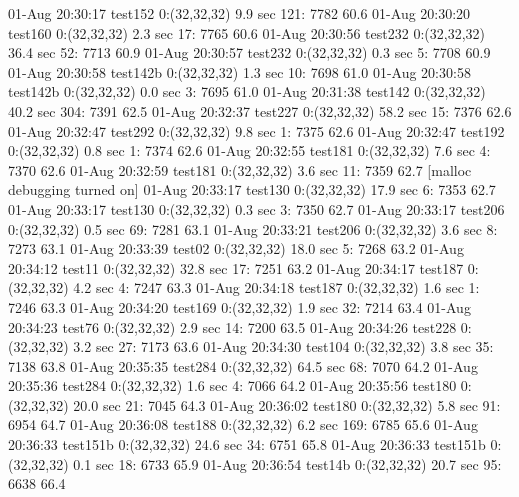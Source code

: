 01-Aug 20:30:17 test152     0:(32,32,32)     9.9 sec  121:  7782 60.6%
01-Aug 20:30:20 test160     0:(32,32,32)     2.3 sec   17:  7765 60.6%
01-Aug 20:30:56 test232     0:(32,32,32)    36.4 sec   52:  7713 60.9%
01-Aug 20:30:57 test232     0:(32,32,32)     0.3 sec    5:  7708 60.9%
01-Aug 20:30:58 test142b    0:(32,32,32)     1.3 sec   10:  7698 61.0%
01-Aug 20:30:58 test142b    0:(32,32,32)     0.0 sec    3:  7695 61.0%
01-Aug 20:31:38 test142     0:(32,32,32)    40.2 sec  304:  7391 62.5%
01-Aug 20:32:37 test227     0:(32,32,32)    58.2 sec   15:  7376 62.6%
01-Aug 20:32:47 test292     0:(32,32,32)     9.8 sec    1:  7375 62.6%
01-Aug 20:32:47 test192     0:(32,32,32)     0.8 sec    1:  7374 62.6%
01-Aug 20:32:55 test181     0:(32,32,32)     7.6 sec    4:  7370 62.6%
01-Aug 20:32:59 test181     0:(32,32,32)     3.6 sec   11:  7359 62.7%
[malloc debugging turned on]
01-Aug 20:33:17 test130     0:(32,32,32)    17.9 sec    6:  7353 62.7%
01-Aug 20:33:17 test130     0:(32,32,32)     0.3 sec    3:  7350 62.7%
01-Aug 20:33:17 test206     0:(32,32,32)     0.5 sec   69:  7281 63.1%
01-Aug 20:33:21 test206     0:(32,32,32)     3.6 sec    8:  7273 63.1%
01-Aug 20:33:39 test02      0:(32,32,32)    18.0 sec    5:  7268 63.2%
01-Aug 20:34:12 test11      0:(32,32,32)    32.8 sec   17:  7251 63.2%
01-Aug 20:34:17 test187     0:(32,32,32)     4.2 sec    4:  7247 63.3%
01-Aug 20:34:18 test187     0:(32,32,32)     1.6 sec    1:  7246 63.3%
01-Aug 20:34:20 test169     0:(32,32,32)     1.9 sec   32:  7214 63.4%
01-Aug 20:34:23 test76      0:(32,32,32)     2.9 sec   14:  7200 63.5%
01-Aug 20:34:26 test228     0:(32,32,32)     3.2 sec   27:  7173 63.6%
01-Aug 20:34:30 test104     0:(32,32,32)     3.8 sec   35:  7138 63.8%
01-Aug 20:35:35 test284     0:(32,32,32)    64.5 sec   68:  7070 64.2%
01-Aug 20:35:36 test284     0:(32,32,32)     1.6 sec    4:  7066 64.2%
01-Aug 20:35:56 test180     0:(32,32,32)    20.0 sec   21:  7045 64.3%
01-Aug 20:36:02 test180     0:(32,32,32)     5.8 sec   91:  6954 64.7%
01-Aug 20:36:08 test188     0:(32,32,32)     6.2 sec  169:  6785 65.6%
01-Aug 20:36:33 test151b    0:(32,32,32)    24.6 sec   34:  6751 65.8%
01-Aug 20:36:33 test151b    0:(32,32,32)     0.1 sec   18:  6733 65.9%
01-Aug 20:36:54 test14b     0:(32,32,32)    20.7 sec   95:  6638 66.4%
